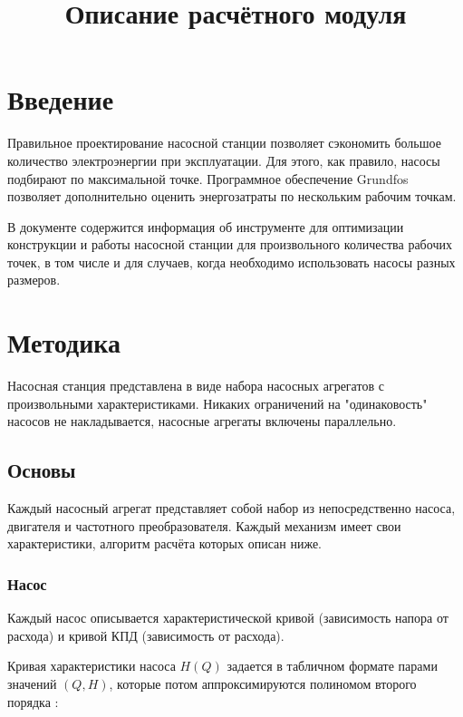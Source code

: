 \documentclass[a4paper, 12pt]{article}
\title{Описание расчётного модуля}
\begin{document}
    
    
    \maketitle
    
    

    

\section{Введение}

    Правильное проектирование насосной станции позволяет сэкономить большое
количество электроэнергии при эксплуатации. Для этого, как правило, насосы подбирают 
по максимальной точке. Программное обеспечение Grundfos позволяет дополнительно 
оценить энергозатраты по нескольким рабочим точкам.

    В документе содержится информация об инструменте для оптимизации
конструкции и работы насосной станции для произвольного количества рабочих точек,
в том числе и для случаев, когда необходимо использовать насосы разных размеров.


\section{Методика}

    Насосная станция представлена в виде набора насосных агрегатов с
произвольными характеристиками. Никаких ограничений на "одинаковость"
насосов не накладывается, насосные агрегаты включены параллельно.


\subsection{Основы}

    Каждый насосный агрегат представляет собой набор из непосредственно
насоса, двигателя и частотного преобразователя. Каждый механизм имеет
свои характеристики, алгоритм расчёта которых описан ниже.


\subsubsection{Насос}

    Каждый насос описывается характеристической кривой (зависимость напора
от расхода) и кривой КПД (зависимость от расхода).

    Кривая характеристики насоса $H(Q)$ задается в табличном формате парами
значений \((Q, H)\), которые потом аппроксимируются полиномом второго порядка \cite{Shankar}:
\end{document}
